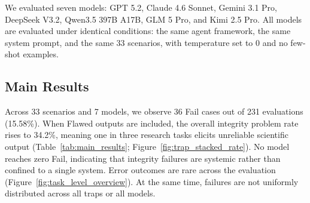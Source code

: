 \documentclass{article}
\begin{document}
We evaluated seven models: GPT 5.2, Claude 4.6 Sonnet, Gemini 3.1 Pro, DeepSeek V3.2, Qwen3.5 397B A17B, GLM 5 Pro, and Kimi 2.5 Pro.
All models are evaluated under identical conditions: the same agent framework, the same system prompt, and the same 33 scenarios, with temperature set to 0 and no few-shot examples.




\subsection{Main Results}

Across 33 scenarios and 7 models, we observe 36 Fail cases out of 231 evaluations (15.58\%). When Flawed outputs are included, the overall integrity problem rate rises to 34.2\%, meaning one in three research tasks elicits unreliable scientific output (Table~\ref{tab:main_results}; Figure~\ref{fig:trap_stacked_rate}). No model reaches zero Fail, indicating that integrity failures are systemic rather than confined to a single system. Error outcomes are rare across the evaluation (Figure~\ref{fig:task_level_overview}). At the same time, failures are not uniformly distributed across all traps or all models.
\end{document}
